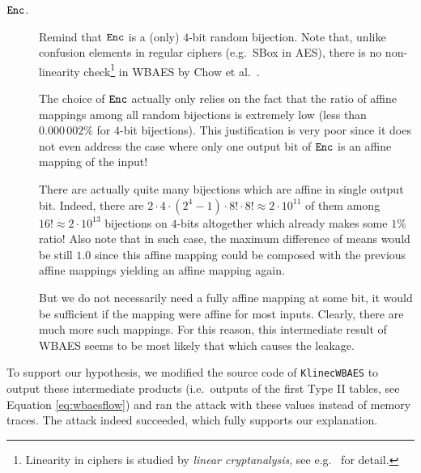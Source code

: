 \begin{description}
	\item[$\texttt{Enc}$.] Remind that $\texttt{Enc}$ is a (only) $4$-bit random bijection. Note that, unlike confusion elements in regular ciphers (e.g.\ SBox in AES), there is no non-linearity check\footnote{Linearity in ciphers is studied by {\em linear cryptanalysis}, see e.g.\ \cite{matsui1993linear} for detail.} in WBAES by Chow et al.\ \cite{chow2002aes}.
	
	The choice of $\texttt{Enc}$ actually only relies on the fact that the ratio of affine mappings among all random bijections is extremely low (less than $0.000\,002\%$ for $4$-bit bijections). This justification is very poor since it does not even address the case where only one output bit of $\texttt{Enc}$ is an affine mapping of the input!
	
	There are actually quite many bijections which are affine in single output bit. Indeed, there are $2\cdot4\cdot(2^4-1)\cdot8!\cdot8! \approx 2\cdot10^{11}$ of them among $16! \approx 2\cdot10^{13}$ bijections on $4$-bits altogether which already makes some $1\%$ ratio! Also note that in such case, the maximum difference of means would be still $1.0$ since this affine mapping could be composed with the previous affine mappings yielding an affine mapping again.
	
	But we do not necessarily need a fully affine mapping at some bit, it would be sufficient if the mapping were affine for most inputs. Clearly, there are much more such mappings. For this reason, this intermediate result of WBAES seems to be most likely that which causes the leakage.
\end{description}

To support our hypothesis, we modified the source code of {\tt KlinecWBAES} to output these intermediate products (i.e.\ outputs of the first Type II tables, see Equation \ref{eq:wbaesflow}) and ran the attack with these values instead of memory traces. The attack indeed succeeded, which fully supports our explanation.


